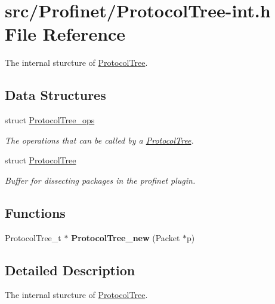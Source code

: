 \hypertarget{_protocol_tree-int_8h}{\section{src/\-Profinet/\-Protocol\-Tree-\/int.h File Reference}
\label{_protocol_tree-int_8h}
}


The internal sturcture of \hyperlink{struct_protocol_tree}{Protocol\-Tree}.  


\subsection*{Data Structures}
\begin{DoxyCompactItemize}
\item 
struct \hyperlink{struct_protocol_tree__ops}{Protocol\-Tree\-\_\-ops}
\begin{DoxyCompactList}\small\item\em The operations that can be called by a \hyperlink{struct_protocol_tree}{Protocol\-Tree}. \end{DoxyCompactList}\item 
struct \hyperlink{struct_protocol_tree}{Protocol\-Tree}
\begin{DoxyCompactList}\small\item\em Buffer for dissecting packages in the profinet plugin. \end{DoxyCompactList}\end{DoxyCompactItemize}
\subsection*{Functions}
\begin{DoxyCompactItemize}
\item 
\hypertarget{_protocol_tree-int_8h_ad95344166c369a93bf4be9c0b894efc2}{Protocol\-Tree\-\_\-t $\ast$ {\bfseries Protocol\-Tree\-\_\-new} (Packet $\ast$p)}\label{_protocol_tree-int_8h_ad95344166c369a93bf4be9c0b894efc2}

\end{DoxyCompactItemize}


\subsection{Detailed Description}
The internal sturcture of \hyperlink{struct_protocol_tree}{Protocol\-Tree}. 